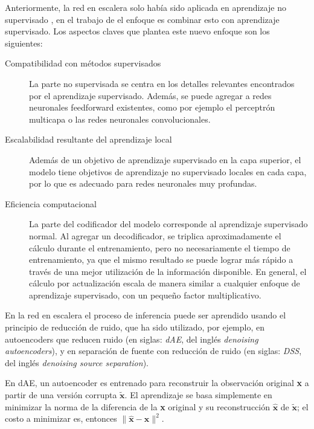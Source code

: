 Anteriormente, la red en escalera solo había sido aplicada en aprendizaje no supervisado \cite{DBLP:journals/corr/Valpola14}, en el trabajo de \cite{DBLP:journals/corr/RasmusVHBR15} el enfoque es combinar esto con aprendizaje supervisado. Los aspectos claves que plantea este nuevo enfoque son los siguientes:

\begin{description}
\item[Compatibilidad con métodos supervisados] La parte no supervisada se centra en los detalles relevantes encontrados por el aprendizaje supervisado. Además, se puede agregar a redes neuronales feedforward existentes, como por ejemplo el perceptrón multicapa o las redes neuronales convolucionales.

\item[Escalabilidad resultante del aprendizaje local] Además de un objetivo de aprendizaje supervisado en la capa superior, el modelo tiene objetivos de aprendizaje no supervisado locales en cada capa, por lo que es adecuado para redes neuronales muy profundas.

\item[Eficiencia computacional] La parte del codificador del modelo corresponde al aprendizaje supervisado normal. Al agregar un decodificador, se triplica aproximadamente el cálculo durante el entrenamiento, pero no necesariamente el tiempo de entrenamiento, ya que el mismo resultado se puede lograr más rápido a través de una mejor utilización de la información disponible. En general, el cálculo por actualización escala de manera similar a cualquier enfoque de aprendizaje supervisado, con un pequeño factor multiplicativo.
\end{description}

En la red en escalera el proceso de inferencia puede ser aprendido usando el principio de reducción de ruido, que ha sido utilizado, por ejemplo, en autoencoders que reducen ruido (en siglas: {\em dAE}, del inglés \textit{denoising autoencoders}), y en separación de fuente con reducción de ruido (en siglas: {\em DSS}, del inglés \textit{denoising source separation}).

En dAE, un autoencoder es entrenado para reconstruir la observación original \textbf{x} a partir de una versión corrupta $\tilde{\textbf{x}}$. El aprendizaje se basa simplemente en minimizar la norma de la diferencia de la \textbf{x} original y su reconstrucción $\hat{\textbf{x}}$ de $\tilde{\textbf{x}}$; el costo a minimizar es, entonces $\|\hat{\textbf{x}} - \textbf{x}\|^2$.

